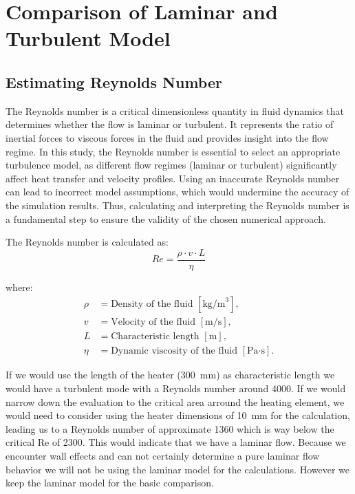 \chapter{Comparison of Laminar and Turbulent Model}
\label{chapter:solver_comp}

\section{Estimating Reynolds Number}

The Reynolds number is a critical dimensionless quantity in fluid dynamics that determines whether the flow is laminar or turbulent. It represents the ratio of inertial forces to viscous forces in the fluid and provides insight into the flow regime. In this study, the Reynolds number is essential to select an appropriate turbulence model, as different flow regimes (laminar or turbulent) significantly affect heat transfer and velocity profiles. Using an inaccurate Reynolds number can lead to incorrect model assumptions, which would undermine the accuracy of the simulation results. Thus, calculating and interpreting the Reynolds number is a fundamental step to ensure the validity of the chosen numerical approach.

The Reynolds number is calculated as:
\begin{equation}
Re = \frac{\rho \cdot v \cdot L}{\eta}
\end{equation}

where:
\begin{align*}
\rho & = \text{Density of the fluid } [\text{kg/m}^3], \\
v & = \text{Velocity of the fluid } [\text{m/s}], \\
L & = \text{Characteristic length } [\text{m}], \\
\eta & = \text{Dynamic viscosity of the fluid } [\text{Pa·s}].
\end{align*}

If we would use the length of the heater (\SI{300}{\mm}) as characteristic length we would have a turbulent mode with a Reynolds number around \SI{4000}{}. If we would narrow down the evaluation to the critical area arround the heating element, we would need to consider using the heater dimensions of \SI{10}{\mm} for the calculation, leading us to a Reynolds number of approximate \SI{1360}{} which is way below the critical Re of \SI{2300}{}. This would indicate that we have a laminar flow.
Because we encounter wall effects and can not certainly determine a pure laminar flow behavior we will not be using the laminar model for the calculations. However we keep the laminar model for the basic comparison.


